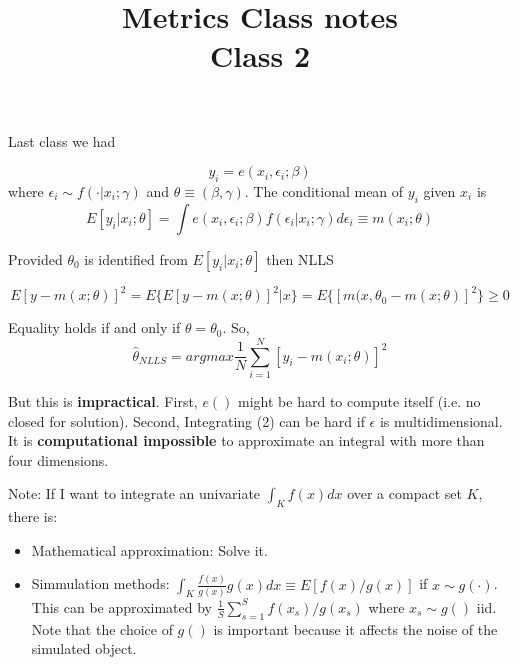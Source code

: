 \documentclass[12pt]{article}
\title{\Large{\textbf{Metrics Class notes}} \\
Class 2}
\begin{document}
\maketitle

Last class we had 

\begin{equation}
	y_i = e(x_i, \epsilon_i; \beta) 
\end{equation}
	where $\epsilon_i \sim f(\cdot | x_i; \gamma )$ and $\theta \equiv (\beta, \gamma)$. The conditional mean of $y_i$ given $x_i$ is 
	\begin{equation}
		E[y_i | x_i; \theta] = \int e(x_i, \epsilon_i; \beta) f(\epsilon_i | x_i; \gamma ) d \epsilon_i 
		\equiv m(x_i; \theta)
	\end{equation}
	
	Provided $\theta_0$ is identified from $E[y_i | x_i; \theta]$ then NLLS
	
	\begin{equation}
		E[y - m(x;\theta)]^2 = E \{ E[y - m(x;\theta)]^2 | x \} = E \{ [m(x,\theta_0 - m(x; \theta)]^2 \} \geq 0
	\end{equation}
	
	Equality holds if and only if $\theta=\theta_0$. So, 
	\begin{equation}
		\hat{\theta}_{NLLS} = argmax \frac{1}{N} \sum^N_{i=1} [y_i - m(x_i; \theta)]^2
	\end{equation}
	
	But this is \textbf{impractical}. First, $e()$ might be hard to compute itself (i.e. no closed for solution). Second, Integrating (2) can be hard if $\epsilon$ is multidimensional. It is \textbf{computational impossible} to approximate an integral with more than four dimensions.
	
	Note: If I want to integrate an univariate $\int_K f(x) dx$ over a compact set $K$, there is:
	\begin{itemize}
		\item Mathematical approximation: Solve it. 
		\item Simmulation methods: $\int_K \frac{f(x)}{g(x)} g(x) dx \equiv E[f(x)/g(x)]$ if $x \sim g(\cdot)$. This can be approximated by $\frac{1}{S} \sum^S_{s=1} f(x_s)/g(x_s)$ where $x_s \sim g()$ iid. Note that the choice of $g()$ is important because it affects the noise of the simulated object.    
	\end{itemize}
	
\end{document}
